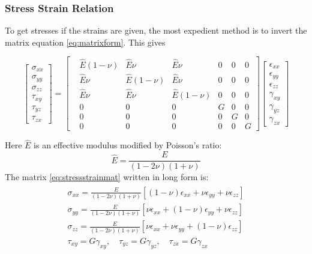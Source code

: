 \subsubsection{Stress Strain Relation}
To get stresses if the strains are given, the most expedient method is to invert the matrix equation \ref{eq:matrixform}. This gives

\begin{equation}
\begin{bmatrix}
\sigma_{xx}\\ 
\sigma_{yy}\\ 
\sigma_{zz}\\ 
\tau_{xy}\\ 
\tau_{yz}\\
\tau_{zx} 
\end{bmatrix}
=
\begin{bmatrix}
 &\hat{E}(1-\nu)  &\hat{E}\nu  &\hat{E}\nu  &0  &0  &0 \\ 
 &\hat{E}\nu  &\hat{E}(1-\nu)  &\hat{E}\nu  &0  &0 &0 \\ 
 &\hat{E}\nu  &\hat{E}\nu  &\hat{E}(1-\nu)  &0  &0 &0 \\ 
 &0  &0  &0  &G  &0 &0 \\
 &0  &0  &0  &0  &G &0 \\ 
 &0  &0  &0  &0  &0 &G
\end{bmatrix}
\begin{bmatrix}
\epsilon_{xx}\\ 
\epsilon_{yy}\\ 
\epsilon_{zz}\\ 
\gamma_{xy}\\ 
\gamma_{yz}\\
\gamma_{zx} 
\end{bmatrix}
\label{eq:stressstrainmat}
\end{equation}

Here $\hat{E}$ is an effective modulus modified by Poisson's ratio:
\begin{equation}
\hat{E} = \frac{E}{(1-2\nu)(1+\nu)}
\end{equation}
The matrix \ref{eq:stressstrainmat} written in long form is:
\begin{align}
\begin{split}
\sigma_{xx} = \frac{E}{(1-2\nu)(1+\nu)}[(1-\nu)\epsilon_{xx} + \nu\epsilon_{yy}+\nu\epsilon_{zz}] \\
\sigma_{yy} = \frac{E}{(1-2\nu)(1+\nu)}[\nu\epsilon_{xx} + (1-\nu)\epsilon_{yy}+\nu\epsilon_{zz}] \\
\sigma_{zz} = \frac{E}{(1-2\nu)(1+\nu)}[\nu\epsilon_{xx} + \nu\epsilon_{yy}+(1-\nu)\epsilon_{zz}] \\
\tau_{xy} = G\gamma_{xy}, \quad \tau_{yz} = G\gamma_{yz}, \quad \tau_{zx} = G\gamma_{zx}
\end{split}
\end{align}



